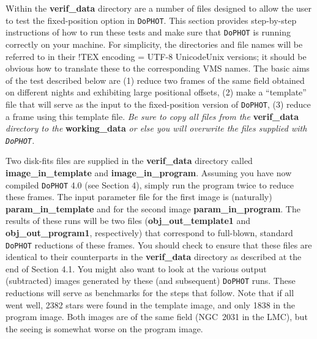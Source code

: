 Within the {\bf verif\_data} directory are a number of files designed
to allow the user to test the fixed-position option in {\tt DoPHOT}.  This 
section provides step-by-step instructions of how to run these tests and
make sure that {\tt DoPHOT} is running correctly on your machine.  For 
simplicity, the directories and file names will be referred to in their
!TEX encoding = UTF-8 UnicodeUnix versions;  it should be obvious how to translate these to 
the corresponding VMS names.
The basic aims of the test described below are (1) reduce two frames of
the same field obtained on different nights and exhibiting large 
positional offsets, (2) make a ``template'' file that will serve as the
input to the fixed-position version of {\tt DoPHOT}, (3) reduce a frame using
this template file.  {\it Be sure to copy all files from the} {\bf
verif\_data} {\it directory to the} {\bf working\_data} {\it or else you will
overwrite the files supplied with {\tt DoPHOT}.}

Two disk-fits files are supplied in the {\bf verif\_data} directory called
{\bf image\_in\_template} and {\bf image\_in\_program}.  Assuming you have 
now compiled {\tt DoPHOT} 4.0 (see Section 4), simply run the program twice to
reduce these frames.  The input parameter file for the first image is
(naturally) {\bf param\_in\_template} and for the second image 
{\bf param\_in\_program}.   The results of these runs will be two files
({\bf obj\_out\_template1} and {\bf obj\_out\_program1}, respectively) that
correspond to full-blown, standard {\tt DoPHOT} reductions of these frames.
You should check to ensure that these files are identical to their 
counterparts in the {\bf verif\_data} directory as described at the end of
Section 4.1.   You might also want to look at the various output (subtracted)
images generated by these (and subsequent) {\tt DoPHOT} runs.
These reductions will serve as benchmarks for the steps
that follow.  Note that if all went well, 2382 stars were found in the
template image, and only 1838 in the program image.  Both images are of the
same field (NGC~2031 in the LMC), but the seeing is somewhat worse on the
program image.

